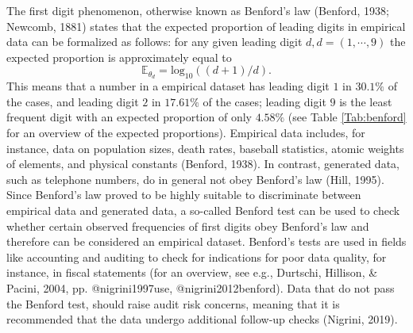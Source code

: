 \documentclass[
  english,
  man,floatsintext]{apa6}
\begin{document}
The first digit phenomenon, otherwise known as Benford's law (Benford, 1938; Newcomb, 1881) states that the expected proportion of leading digits in empirical data can be formalized as follows: for any given leading digit \(d, d = (1, \cdots, 9)\) the expected proportion is approximately equal to \[\mathbb{E}_{\theta_d}= \text{log}_{10}((d + 1)/d).\] This means that a number in a empirical dataset has leading digit \(1\) in \(30.1 \%\) of the cases, and leading digit \(2\) in \(17.61 \%\) of the cases; leading digit \(9\) is the least frequent digit with an expected proportion of only \(4.58 \%\) (see Table \ref{Tab:benford} for an overview of the expected proportions). Empirical data includes, for instance, data on population sizes, death rates, baseball statistics, atomic weights of elements, and physical constants (Benford, 1938). In contrast, generated data, such as telephone numbers, do in general not obey Benford's law (Hill, 1995). Since Benford's law proved to be highly suitable to discriminate between empirical data and generated data, a so-called Benford test can be used to check whether certain observed frequencies of first digits obey Benford's law and therefore can be considered an empirical dataset. Benford's tests are used in fields like accounting and auditing to check for indications for poor data quality, for instance, in fiscal statements (for an overview, see e.g., Durtschi, Hillison, \& Pacini, 2004, pp. @nigrini1997use, @nigrini2012benford). Data that do not pass the Benford test, should raise audit risk concerns, meaning that it is recommended that the data undergo additional follow-up checks (Nigrini, 2019).
\end{document}
